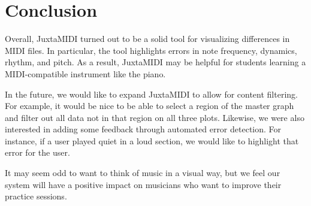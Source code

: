 \documentclass[journal]{vgtc}                %
\begin{document}
\section{Conclusion}

Overall, JuxtaMIDI turned out to be a solid tool for visualizing differences
in MIDI files. In particular, the tool highlights errors in note frequency,
dynamics, rhythm, and pitch. As a result, JuxtaMIDI may be helpful for
students learning a MIDI-compatible instrument like the piano.

In the future, we would like to expand JuxtaMIDI to allow for content filtering.
For example, it would be nice to be able to select a region of the master graph
and filter out all data not in that region on all three plots. Likewise, we
were also interested in adding some feedback through automated error detection.
For instance, if a user played quiet in a loud section, we would like to
highlight that error for the user.

It may seem odd to want to think of music in a visual way, but we feel our
system will have a positive impact on musicians who want to improve their
practice sessions.
\end{document}
